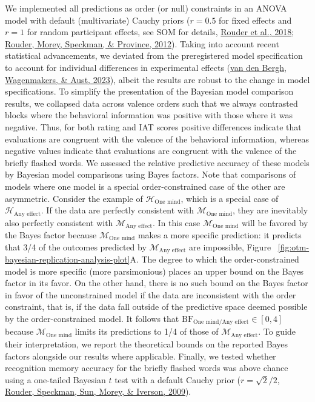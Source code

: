 \documentclass[
  man,floatsintext]{apa6}
\begin{document}
We implemented all predictions as order (or null) constraints in an ANOVA model with default (multivariate) Cauchy priors (\(r = 0.5\) for fixed effects and \(r = 1\) for random participant effects, see SOM for details, \protect\hyperlink{ref-rouder_theories_2018}{Rouder et al., 2018}; \protect\hyperlink{ref-rouder_default_2012}{Rouder, Morey, Speckman, \& Province, 2012}).
Taking into account recent statistical advancements, we deviated from the preregistered model specification to account for individual differences in experimental effects (\protect\hyperlink{ref-vandenBergh2023}{van den Bergh, Wagenmakers, \& Aust, 2023}), albeit the results are robust to the change in model specifications.
To simplify the presentation of the Bayesian model comparison results, we collapsed data across valence orders such that we always contrasted blocks where the behavioral information was positive with those where it was negative.
Thus, for both rating and IAT scores positive differences indicate that evaluations are congruent with the valence of the behavioral information, whereas negative values indicate that evaluations are congruent with the valence of the briefly flashed words.
We assessed the relative predictive accuracy of these models by Bayesian model comparisons using Bayes factors.
Note that comparisons of models where one model is a special order-constrained case of the other are asymmetric.
Consider the example of \(\mathcal{H}_\textrm{One mind}\), which is a special case of \(\mathcal{H}_\textrm{Any effect}\).
If the data are perfectly consistent with \(\mathcal{M}_\textrm{One mind}\), they are inevitably also perfectly consistent with \(\mathcal{M}_\textrm{Any effect}\).
In this case \(\mathcal{M}_\textrm{One mind}\) will be favored by the Bayes factor because \(\mathcal{M}_\textrm{One mind}\) makes a more specific prediction: it predicts that 3/4 of the outcomes predicted by \(\mathcal{M}_\textrm{Any effect}\) are impossible, Figure ~\ref{fig:otm-bayesian-replication-analysis-plot}A.
The degree to which the order-constrained model is more specific (more parsimonious) places an upper bound on the Bayes factor in its favor.
On the other hand, there is no such bound on the Bayes factor in favor of the unconstrained model if the data are inconsistent with the order constraint, that is, if the data fall outside of the predictive space deemed possible by the order-constrained model.
It follows that \(\mathrm{BF}_{\textrm{One mind}/\textrm{Any effect}} \in [0, 4]\) because \(\mathcal{M}_\textrm{One mind}\) limits its predictions to 1/4 of those of \(\mathcal{M}_\textrm{Any effect}\).
To guide their interpretation, we report the theoretical bounds on the reported Bayes factors alongside our results where applicable.
Finally, we tested whether recognition memory accuracy for the briefly flashed words was above chance using a one-tailed Bayesian \(t\) test with a default Cauchy prior (\(r = \sqrt2/2\), \protect\hyperlink{ref-rouder_bayesian_2009}{Rouder, Speckman, Sun, Morey, \& Iverson, 2009}).
\end{document}
